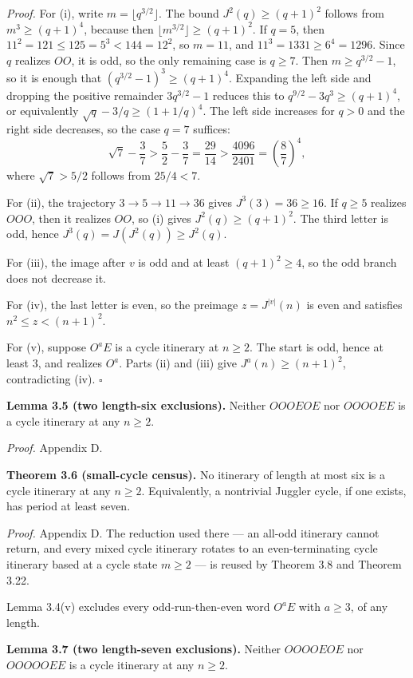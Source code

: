 \documentclass[12pt]{article}
\begin{document}
\emph{Proof.} For (i), write \(m=\lfloor q^{3/2}\rfloor\). The bound
\(J^2(q)\ge(q+1)^2\) follows from \(m^3\ge(q+1)^4\), because then
\(\lfloor m^{3/2}\rfloor\ge(q+1)^2\). If \(q=5\), then
\(11^2=121\le 125=5^3<144=12^2\), so \(m=11\), and
\(11^3=1331\ge 6^4=1296\). Since \(q\) realizes \(OO\), it is odd, so
the only remaining case is \(q\ge 7\). Then \(m\ge q^{3/2}-1\), so it is
enough that \((q^{3/2}-1)^3\ge(q+1)^4\). Expanding the left side and
dropping the positive remainder \(3q^{3/2}-1\) reduces this to
\(q^{9/2}-3q^3\ge(q+1)^4\), or equivalently \(\sqrt q-3/q\ge(1+1/q)^4\).
The left side increases for \(q>0\) and the right side decreases, so the
case \(q=7\) suffices: \[
\sqrt7-\frac37>\frac52-\frac37=\frac{29}{14}
  >\frac{4096}{2401}=\left(\frac87\right)^4,
\] where \(\sqrt7>5/2\) follows from \(25/4<7\).

For (ii), the trajectory \(3\to 5\to 11\to 36\) gives
\(J^3(3)=36\ge 16\). If \(q\ge 5\) realizes \(OOO\), then it realizes
\(OO\), so (i) gives \(J^2(q)\ge(q+1)^2\). The third letter is odd,
hence \(J^3(q)=J(J^2(q))\ge J^2(q)\).

For (iii), the image after \(v\) is odd and at least \((q+1)^2\ge 4\),
so the odd branch does not decrease it.

For (iv), the last letter is even, so the preimage \(z=J^{|v|}(n)\) is
even and satisfies \(n^2\le z<(n+1)^2\).

For (v), suppose \(O^aE\) is a cycle itinerary at \(n\ge 2\). The start
is odd, hence at least \(3\), and realizes \(O^a\). Parts (ii) and (iii)
give \(J^a(n)\ge(n+1)^2\), contradicting (iv). \(\square\)

\textbf{Lemma 3.5 (two length-six exclusions).} Neither \(OOOEOE\) nor
\(OOOOEE\) is a cycle itinerary at any \(n\ge 2\).

\emph{Proof.} Appendix D.

\textbf{Theorem 3.6 (small-cycle census).} No itinerary of length at
most six is a cycle itinerary at any \(n\ge 2\). Equivalently, a
nontrivial Juggler cycle, if one exists, has period at least seven.

\emph{Proof.} Appendix D. The reduction used there --- an all-odd
itinerary cannot return, and every mixed cycle itinerary rotates to an
even-terminating cycle itinerary based at a cycle state \(m\ge 2\) ---
is reused by Theorem 3.8 and Theorem 3.22.

Lemma 3.4(v) excludes every odd-run-then-even word \(O^aE\) with
\(a\ge 3\), of any length.

\textbf{Lemma 3.7 (two length-seven exclusions).} Neither \(OOOOEOE\)
nor \(OOOOOEE\) is a cycle itinerary at any \(n\ge 2\).
\end{document}
